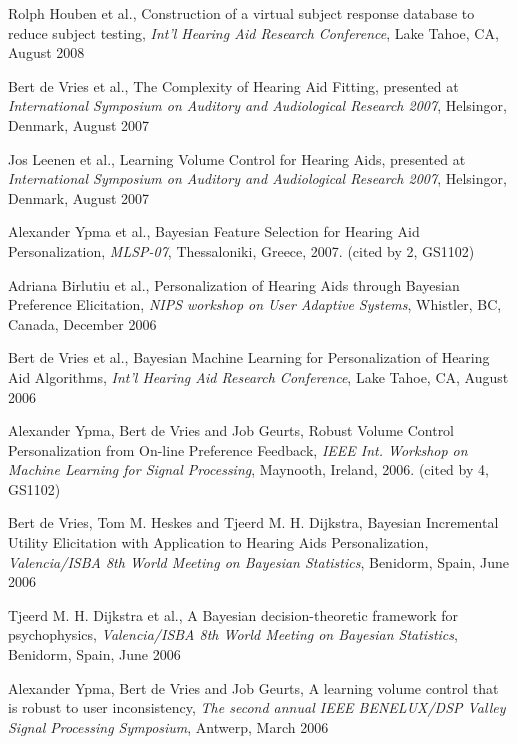 \begin{etaremune}
\item Rolph Houben et al., Construction of a virtual subject response database to reduce subject testing, \emph{Int'l Hearing Aid Research Conference}, Lake Tahoe, CA, August 2008

\item Bert de Vries et al., The Complexity of Hearing Aid Fitting, presented at \emph{International Symposium on Auditory and Audiological Research 2007}, Helsingor, Denmark, August 2007

\item Jos Leenen et al., Learning Volume Control for Hearing Aids, presented at \emph{International Symposium on Auditory and Audiological Research 2007}, Helsingor, Denmark, August 2007

\item Alexander Ypma et al., Bayesian Feature Selection for Hearing Aid Personalization,  \emph{MLSP-07}, Thessaloniki, Greece, 2007. (cited by 2, GS1102)

\item Adriana Birlutiu et al., Personalization of Hearing Aids through Bayesian Preference Elicitation, \emph{NIPS workshop on User Adaptive Systems}, Whistler, BC, Canada, December 2006

\item Bert de Vries et al., Bayesian Machine Learning for Personalization of Hearing Aid Algorithms, \emph{Int'l Hearing Aid Research Conference}, Lake Tahoe, CA, August 2006

\item Alexander Ypma, Bert de Vries and Job Geurts, Robust Volume Control Personalization from On-line Preference Feedback, \emph{IEEE Int. Workshop on
Machine Learning for Signal Processing}, Maynooth, Ireland, 2006. (cited by 4, GS1102)

\item Bert de Vries, Tom M. Heskes and Tjeerd M. H. Dijkstra, Bayesian Incremental Utility Elicitation with Application to Hearing Aids Personalization, \emph{Valencia/ISBA 8th World Meeting on Bayesian Statistics}, Benidorm, Spain, June 2006

\item Tjeerd M. H. Dijkstra et al., A Bayesian decision-theoretic framework for psychophysics, \emph{Valencia/ISBA 8th World Meeting on Bayesian Statistics}, Benidorm, Spain, June 2006

\item Alexander Ypma, Bert de Vries and Job Geurts, A learning volume control that is robust to user inconsistency,  \emph{The second annual
IEEE BENELUX/DSP Valley Signal Processing Symposium}, Antwerp, March 2006


\end{etaremune}
